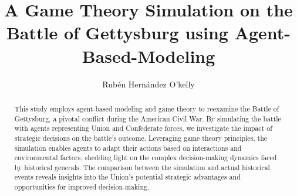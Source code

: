 \documentclass[final,5p,times,twocolumn,authoryear]{elsarticle}
\begin{document}
\begin{frontmatter}



\title{A Game Theory Simulation on the Battle of Gettysburg using Agent-Based-Modeling}

\author{Rubén Hernández O'kelly}

\begin{abstract}
This study employs agent-based modeling and game theory to reexamine the Battle of Gettysburg, a pivotal conflict during the American Civil War. By simulating the battle with agents representing Union and Confederate forces, we investigate the impact of strategic decisions on the battle's outcome. Leveraging game theory principles, the simulation enables agents to adapt their actions based on interactions and environmental factors, shedding light on the complex decision-making dynamics faced by historical generals. The comparison between the simulation and actual historical events reveals insights into the Union's potential strategic advantages and opportunities for improved decision-making.


\end{abstract}
\end{frontmatter}
\end{document}
